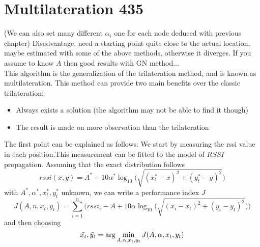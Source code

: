 \documentclass[12pt,twoside]{report}
\begin{document}
\section{Multilateration 435}
(We can also set many different $\alpha_i$ one for each node deduced with previous chapter)
Disadvantage, need a starting point quite close to the actual location, maybe estimated with some of the above methods, otherwise it diverges.
If you assume to know $A$ then good results with GN method...\\
This algorithm is the generalization of the trilateration method, and is known as multilateration. 
This method can provide two main benefits over the classic trilateration:
\begin{itemize}
    \item Always exists a solution (the algorithm may not be able to find it though)
    \item The result is made on more observation than the trilateration
\end{itemize}
The first point can be explained as follows:
We start by measuring the rssi value in each position.This measurement can be fitted to the model of $RSSI$ propagation. Assuming that the exact distribution follows 
\begin{equation}
rssi(x,y)=A^*-10\alpha^*\log_{10}\big(\sqrt{(x_t^*-x)^2+(y_t^*-y)^2}\big)    
\end{equation}
with $A^*,\alpha^*,x^*_t,y^*_t$ unknown, we can write a performance index $J$
\begin{equation}
    J(A,n,x_t,y_t)=\sum_{i=1}^n\bigg(rssi_i-A+10\alpha\log_{10}\big(\sqrt{(x_i-x_t)^2+(y_i-y_t)^2}\big)\bigg)
\end{equation}
and then choosing 
\begin{equation}
\Bar{x_t}, \Bar{y_t}=\arg \min_{A,\alpha,x_t,y_t}J(A,\alpha,x_t,y_t)
\end{equation}
\clearpage
\end{document}
